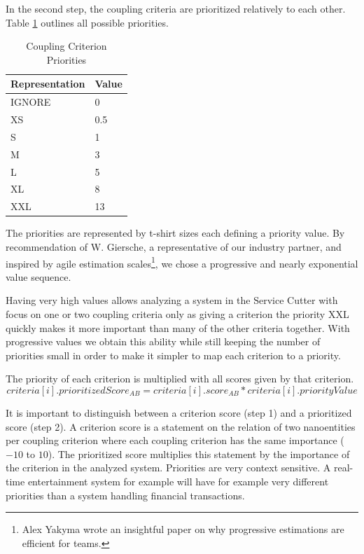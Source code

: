 In the second step, the coupling criteria are prioritized relatively to each other. Table \ref{tab:priorities} outlines all possible priorities.

\begin{table}[H]
	\centering
	\caption{Coupling Criterion Priorities}
	\label{tab:priorities}
	\begin{tabular}{|p{70pt}|p{30pt}|}
		\hline	
		Representation & Value  \\
		\hline
		IGNORE & 0  \\
		\hline
		XS & 0.5  \\
		\hline
		S & 1  \\
		\hline
		M & 3  \\
		\hline
		L & 5  \\
		\hline
		XL & 8  \\
		\hline
		XXL & 13  \\
		\hline
	\end{tabular}
\end{table}

The priorities are represented by t-shirt sizes each defining a priority value. By recommendation of W. Giersche, a representative of our industry partner, and inspired by agile estimation scales\footnote{Alex Yakyma wrote an insightful paper on why progressive estimations are efficient for teams\cite{estimation}.}, we chose a progressive and nearly exponential value sequence. 

Having very high values allows analyzing a system in the Service Cutter with focus on one or two coupling criteria only as giving a criterion the priority XXL quickly makes it more important than many of the other criteria together. With progressive values we obtain this ability while still keeping the number of priorities small in order to make it simpler to map each criterion to a priority. 

The priority of each criterion is multiplied with all scores given by that criterion. 
\begin{displaymath}
	criteria[i].prioritizedScore_{AB} = criteria[i].score_{AB} * criteria[i].priorityValue
\end{displaymath}

It is important to distinguish between a criterion score (step 1) and a prioritized score (step 2). A criterion score is a statement on the relation of two nanoentities per coupling criterion where each coupling criterion has the same importance ($-10$ to $10$). The prioritized score multiplies this statement by the importance of the criterion in the analyzed system. Priorities are very context sensitive. A real-time entertainment system for example will have for example very different priorities than a system handling financial transactions. 

